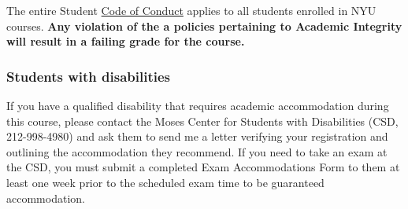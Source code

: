 \documentclass[12pt,pdftex,twoside,letterpaper]{exam}
\begin{document}
\begin{itemize}
  The entire Student \href{https://www.nyu.edu/about/policies-guidelines-compliance/compliance/code-of-ethical-conduct.html}{Code of Conduct}
  applies to all students enrolled in NYU courses. \textbf{Any violation of the a policies
  pertaining to Academic Integrity will result in a failing grade for the course.}
\end{itemize}

\subsubsection*{Students with disabilities}

  If you have a qualified disability that requires academic accommodation during this course,
  please contact the Moses Center for Students with Disabilities (CSD, 212-998-4980) and ask them
  to send me a letter verifying your registration and outlining the accommodation they recommend.
  If you need to take an exam at the CSD, you must submit a completed Exam Accommodations Form to
  them at least one week prior to the scheduled exam time to be guaranteed accommodation.
\end{document}
